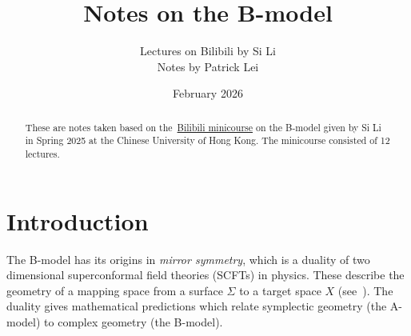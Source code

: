 \documentclass[article,10pt,oneside,oldfontcommands]{memoir}
\title{Notes on the B-model}
\author{Lectures on Bilibili by Si Li \\ Notes by Patrick Lei}
\date{February 2026}
\theoremstyle{definition}
\theoremstyle{remark}
\theoremstyle{plain}
\theoremstyle{definition}
\theoremstyle{remark}
\newcommand{\1}{\mathbf{1}}
\newcommand{\2}{\mathbf{2}}
\newcommand{\3}{\mathbf{3}}
\begin{document}
\maketitle
    
\begin{abstract}
    These are notes taken based on the~\href{https://space.bilibili.com/510673295/lists/5119099?type=season}{Bilibili minicourse} on the B-model given by Si Li in Spring 2025 at the Chinese University of Hong Kong. The minicourse consisted of 12 lectures.
\end{abstract}



\tableofcontents

\chapter{Introduction}%
\label{cha:introduction}

The B-model has its origins in \textit{mirror symmetry}, which is a duality of two dimensional superconformal field theories (SCFTs) in physics. These describe the geometry of a mapping space from a surface \(\Sigma\) to a target space \(X\) (see~). The duality gives mathematical predictions which relate symplectic geometry (the A-model) to complex geometry (the B-model).
\end{document}
